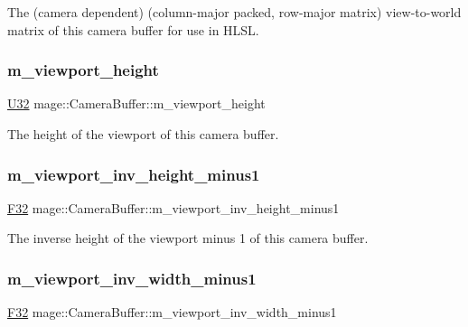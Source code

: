 The (camera dependent) (column-\/major packed, row-\/major matrix) view-\/to-\/world matrix of this camera buffer for use in H\+L\+SL. \hypertarget{structmage_1_1_camera_buffer_a125fd91de1c41cc5bd1a741295bf0536}{}\label{structmage_1_1_camera_buffer_a125fd91de1c41cc5bd1a741295bf0536} 
\subsubsection{\texorpdfstring{m\+\_\+viewport\+\_\+height}{m\_viewport\_height}}
{\footnotesize\ttfamily \hyperlink{namespacemage_a41c104c036fba3756a74e19f793eeaa1}{U32} mage\+::\+Camera\+Buffer\+::m\+\_\+viewport\+\_\+height}

The height of the viewport of this camera buffer. \hypertarget{structmage_1_1_camera_buffer_a05564cd690597c4700ca292c942c0737}{}\label{structmage_1_1_camera_buffer_a05564cd690597c4700ca292c942c0737} 
\subsubsection{\texorpdfstring{m\+\_\+viewport\+\_\+inv\+\_\+height\+\_\+minus1}{m\_viewport\_inv\_height\_minus1}}
{\footnotesize\ttfamily \hyperlink{namespacemage_aa97e833b45f06d60a0a9c4fc22ae02c0}{F32} mage\+::\+Camera\+Buffer\+::m\+\_\+viewport\+\_\+inv\+\_\+height\+\_\+minus1}

The inverse height of the viewport minus 1 of this camera buffer. \hypertarget{structmage_1_1_camera_buffer_a3d56a38eb30fb0f0778d23f61f9988fa}{}\label{structmage_1_1_camera_buffer_a3d56a38eb30fb0f0778d23f61f9988fa} 
\subsubsection{\texorpdfstring{m\+\_\+viewport\+\_\+inv\+\_\+width\+\_\+minus1}{m\_viewport\_inv\_width\_minus1}}
{\footnotesize\ttfamily \hyperlink{namespacemage_aa97e833b45f06d60a0a9c4fc22ae02c0}{F32} mage\+::\+Camera\+Buffer\+::m\+\_\+viewport\+\_\+inv\+\_\+width\+\_\+minus1}

